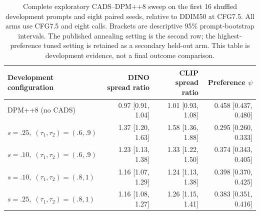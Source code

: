 \begin{table}[t]
\centering\small
\begin{tabular}{lrrr}
\toprule
Development configuration & DINO spread ratio & CLIP spread ratio & Preference $\psi$ \\
\midrule
DPM++8 (no CADS) & 0.97 [0.91, 1.04] & 1.01 [0.93, 1.08] & 0.458 [0.437, 0.480] \\
$s=.25,\;(\tau_1,\tau_2)=(.6,.9)$ & 1.37 [1.20, 1.63] & 1.58 [1.36, 1.88] & 0.295 [0.260, 0.333] \\
$s=.10,\;(\tau_1,\tau_2)=(.6,.9)$ & 1.23 [1.13, 1.38] & 1.33 [1.22, 1.50] & 0.374 [0.343, 0.405] \\
$s=.10,\;(\tau_1,\tau_2)=(.8,1)$ & 1.16 [1.07, 1.29] & 1.24 [1.13, 1.38] & 0.398 [0.370, 0.425] \\
$s=.25,\;(\tau_1,\tau_2)=(.8,1)$ & 1.16 [1.08, 1.27] & 1.26 [1.15, 1.41] & 0.383 [0.351, 0.416] \\
\bottomrule
\end{tabular}
\caption{Complete exploratory CADS--DPM++8 sweep on the first 16 shuffled development prompts and eight paired seeds, relative to DDIM50 at CFG7.5. All arms use CFG7.5 and eight calls. Brackets are descriptive 95\% prompt-bootstrap intervals. The published annealing setting is the second row; the highest-preference tuned setting is retained as a secondary held-out arm. This table is development evidence, not a final outcome comparison.}
\label{tab:t2i_cads_development}
\end{table}
